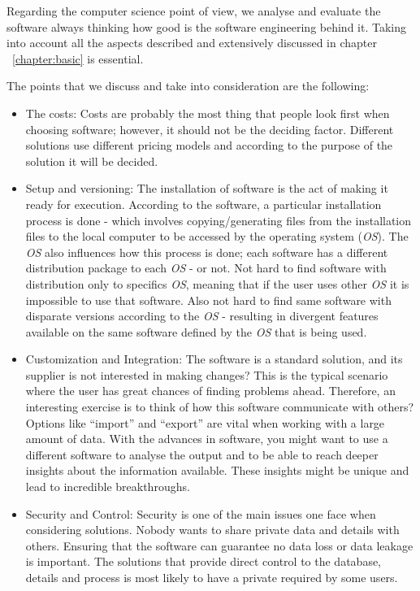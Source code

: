 Regarding the computer science point of view, we analyse and evaluate the software always thinking how good is the software engineering behind it. Taking into account all the aspects described and extensively discussed in chapter ~\ref{chapter:basic} is essential.

The points that we discuss and take into consideration are the following:
\begin{itemize}
\item The costs: Costs are probably the most thing that people look first when choosing software; however, it should not be the deciding factor. Different solutions use different pricing models and according to the purpose of the solution it will be decided.

\item Setup and versioning: The installation of software is the act of making it ready for execution. According to the software, a particular installation process is done - which involves copying/generating files from the installation files to the local computer to be accessed by the operating system (\emph{OS}). The \emph{OS} also influences how this process is done; each software has a different distribution package to each \emph{OS} - or not. Not hard to find software with distribution only to specifics \emph{OS}, meaning that if the user uses other \emph{OS} it is impossible to use that software. Also not hard to find same software with disparate versions according to the \emph{OS} - resulting in divergent features available on the same software defined by the \emph{OS} that is being used.

\item Customization and Integration: The software is a standard solution, and its supplier is not interested in making changes? This is the typical scenario where the user has great chances of finding problems ahead. Therefore, an interesting exercise is to think of how this software communicate with others? Options like  ``import'' and ``export'' are vital when working with a large amount of data. With the advances in software, you might want to use a different software to analyse the output and to be able to reach deeper insights about the information available. These insights might be unique and lead to incredible breakthroughs.

\item Security and Control: Security is one of the main issues one face when considering solutions. Nobody wants to share private data and details with others. Ensuring that the software can guarantee no data loss or data leakage is important. The solutions that provide direct control to the database, details and process is most likely to have a private required by some users.


\end{itemize}
